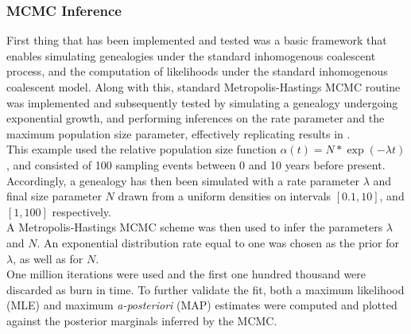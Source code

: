 \documentclass{ieeeaccess}
\theoremstyle{definition}
\begin{document}
\subsubsection{MCMC Inference}
First thing that has been implemented and tested was a basic framework that enables simulating genealogies under the standard inhomogenous coalescent process, and the computation of likelihoods under the standard inhomogenous coalescent model. Along with this, standard Metropolis-Hastings MCMC routine was implemented and subsequently tested by simulating a genealogy undergoing exponential growth, and performing inferences on the rate parameter and the maximum population size parameter, effectively replicating results in \cite{drummond_estimating_2002}.\\
This example used the relative population size function $\alpha(t) = N*\exp(-\lambda t)$, and consisted of 100 sampling events between 0 and 10 years before present.
Accordingly, a genealogy has then been simulated with a rate parameter $\lambda$ and final size parameter $N$ drawn from a uniform densities on intervals $[0.1, 10]$, and $[1,100]$ respectively.\\
A Metropolis-Hastings MCMC scheme was then used to infer the parameters $\lambda$ and $N$. An exponential distribution rate equal to one was chosen as the prior for $\lambda$, as well as for $N$.\\
One million iterations were used and the first one hundred thousand were discarded as burn in time. To further validate the fit, both a maximum likelihood (MLE) and maximum \textit{a-posteriori} (MAP) estimates were computed and plotted against the posterior marginals inferred by the MCMC.
\end{document}
